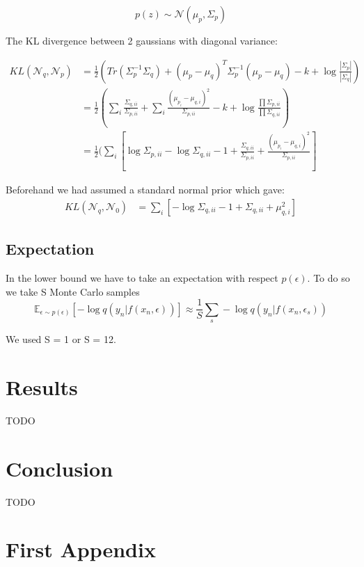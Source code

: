 \documentclass[10pt,oneside,openright]{report}
\begin{document}
$$p(z) \sim \mathcal{N}(\mu_p, \Sigma_p)$$

The KL divergence between 2 gaussians with diagonal variance:

\begin{align}
KL(\mathcal{N}_q, \mathcal{N}_p) &= \frac{1}{2}(Tr(\Sigma_p^{-1}\Sigma_q) + (\mu_p - \mu_q)^T\Sigma_p^{-1}(\mu_p - \mu_q) - k + \log\frac{|\Sigma_p|}{|\Sigma_q|})\\
&= \frac{1}{2}(\sum_i \frac{\Sigma_{q, ii}}{\Sigma_{p, ii}} + \sum_i \frac{(\mu_{p_i} - \mu_{q, i})^2}{\Sigma_{p, ii}} - k + \log\frac{\prod \Sigma_{p, ii}}{\prod \Sigma_{q, ii}})\\
&= \frac{1}{2}(\sum_i[ \log \Sigma_{p, ii} - \log \Sigma_{q, ii} - 1 + \frac{\Sigma_{q, ii}}{\Sigma_{p, ii}} + \frac{(\mu_{p_i} - \mu_{q, i})^2}{\Sigma_{p, ii}}]
\end{align}

Beforehand we had assumed a standard normal prior which gave:
\begin{align}
KL(\mathcal{N}_q, \mathcal{N}_0) &= \sum_i[ -\log \Sigma_{q, ii} - 1 + \Sigma_{q, ii}+ \mu_{q, i}^2]
\end{align}

\section{Expectation}

In the lower bound we have to take an expectation with respect $p(\epsilon)$. To do so we take S Monte Carlo samples 
 $$ \mathbb{E}_{\epsilon \sim p(\epsilon)}[- \log q(y_{n} |f(x_{n}, \epsilon))] \approx \frac{1}{S}\sum_s - \log q(y_{n} |f(x_{n}, \epsilon_s)) $$
 
 We used S = 1 or S = 12.


\chapter{Results}
TODO

\chapter{Conclusion}
TODO

\appendix
\chapter{First Appendix}
\end{document}
